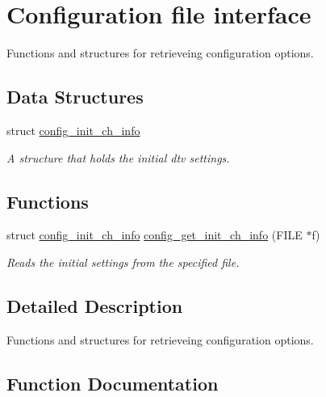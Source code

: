 \hypertarget{group__config}{}\section{Configuration file interface}
\label{group__config}


Functions and structures for retrieveing configuration options.  


\subsection*{Data Structures}
\begin{DoxyCompactItemize}
\item 
struct \hyperlink{structconfig__init__ch__info}{config\+\_\+init\+\_\+ch\+\_\+info}
\begin{DoxyCompactList}\small\item\em A structure that holds the initial dtv settings. \end{DoxyCompactList}\end{DoxyCompactItemize}
\subsection*{Functions}
\begin{DoxyCompactItemize}
\item 
struct \hyperlink{structconfig__init__ch__info}{config\+\_\+init\+\_\+ch\+\_\+info} \hyperlink{group__config_gad7d820530151b1bb2b6cf6e992f48331}{config\+\_\+get\+\_\+init\+\_\+ch\+\_\+info} (F\+I\+LE $\ast$f)
\begin{DoxyCompactList}\small\item\em Reads the initial settings from the specified file. \end{DoxyCompactList}\end{DoxyCompactItemize}


\subsection{Detailed Description}
Functions and structures for retrieveing configuration options. 



\subsection{Function Documentation}

